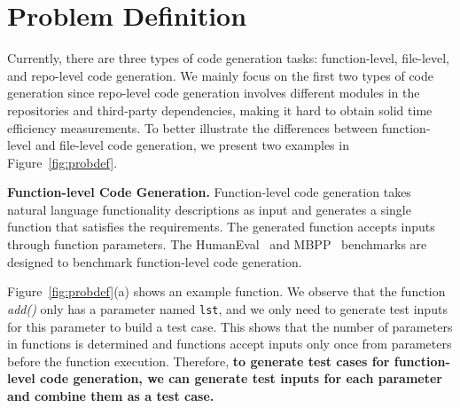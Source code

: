 \section{Problem Definition}\label{sec:mot}

Currently, there are three types of code generation tasks: function-level, file-level, and repo-level code generation. We mainly focus on the first two types of code generation since repo-level code generation involves different modules in the repositories and third-party dependencies, making it hard to obtain solid time efficiency measurements. To better illustrate the differences between function-level and file-level code generation, we present two examples in Figure~\ref{fig:probdef}.

\textbf{Function-level Code Generation.} Function-level code generation takes natural language functionality descriptions as input and generates a single function that satisfies the requirements.
The generated function accepts inputs through function parameters.
The HumanEval~\cite{humaneval} and MBPP~\cite{mbpp} benchmarks are designed to benchmark function-level code generation.


Figure~\ref{fig:probdef}(a) shows an example function.
We observe that the function \textit{add()} only has a parameter named \texttt{lst}, and we only need to generate test inputs for this parameter to build a test case.
This shows that the number of parameters in functions is determined and functions accept inputs only once from parameters before the function execution.
Therefore, \textbf{to generate test cases for function-level code generation, we can generate test inputs for each parameter and combine them as a test case.}



